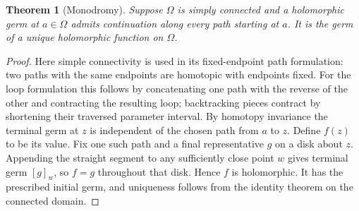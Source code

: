 \documentclass[11pt,a4paper,openany]{book}
\newtheorem{theorem}{Theorem}[chapter]
\theoremstyle{definition}
\theoremstyle{remark}\newtheorem{remark}[theorem]{Remark}
\newcommand{\family}[1]{}
\begin{document}
\begin{theorem}[Monodromy]\label{d12:19-06}\family{D12.19.06}
Suppose $\Omega$ is simply connected and a holomorphic germ at $a\in\Omega$
admits continuation along every path starting at $a$. It is the germ of a
unique holomorphic function on $\Omega$.
\end{theorem}
\begin{proof}
Here simple connectivity is used in its fixed-endpoint path formulation:
two paths with the same endpoints are homotopic with endpoints fixed.
For the loop formulation this follows by concatenating one path with the
reverse of the other and contracting the resulting loop; backtracking
pieces contract by shortening their traversed parameter interval.
By homotopy invariance the terminal germ at $z$ is independent of the
chosen path from $a$ to $z$. Define $f(z)$ to be its value. Fix one such
path and a final representative $g$ on a disk about $z$. Appending the
straight segment to any sufficiently close point $w$ gives terminal germ
$[g]_w$, so $f=g$ throughout that disk. Hence $f$ is holomorphic. It has
the prescribed initial germ, and uniqueness follows from the identity
theorem on the connected domain.
\end{proof}
\end{document}
